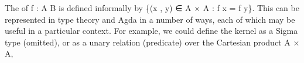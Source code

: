 The  of \ab f \as : \ab A  \ab B is defined informally by \{(\ab x , \ab y) ∈ \ab A × \ab A : \ab f \ab x = \ab f \ab y\}. This can be represented in type theory and Agda in a number of ways, each of which may be useful in a particular context. For example, we could define the kernel as a Sigma type (omitted),
or as a unary relation (predicate) over the Cartesian product \ab A × \ab A,
\ccpad
\begin{code}%
\>[1]\AgdaSpace{}%
\AgdaSymbol{:}\AgdaSpace{}%
\AgdaSymbol{\{}\AgdaSpace{}%
\AgdaSymbol{:}\AgdaSpace{}%
%
\AgdaSymbol{\}\{}\AgdaSpace{}%
\AgdaSymbol{:}\AgdaSpace{}%
%
\AgdaSymbol{\}}\AgdaSpace{}%
\AgdaSpace{}%
\AgdaSymbol{(}\AgdaSpace{}%
\AgdaSpace{}%
\AgdaSymbol{)}\AgdaSpace{}%
\AgdaSpace{}%
\AgdaSpace{}%
\AgdaSymbol{(}\AgdaSpace{}%
\AgdaSpace{}%
\AgdaSymbol{)}\AgdaSpace{}%
\<%
\\
%
\>[1]\AgdaSpace{}%
\AgdaSpace{}%
\AgdaSymbol{(}\AgdaSpace{}%
\AgdaOperator{\AgdaInductiveConstructor{,}}\AgdaSpace{}%
\AgdaSymbol{)}\AgdaSpace{}%
\AgdaSymbol{=}\AgdaSpace{}%
\AgdaSpace{}%
\AgdaSpace{}%
\AgdaSpace{}%
\AgdaSpace{}%
\<%
\end{code}

